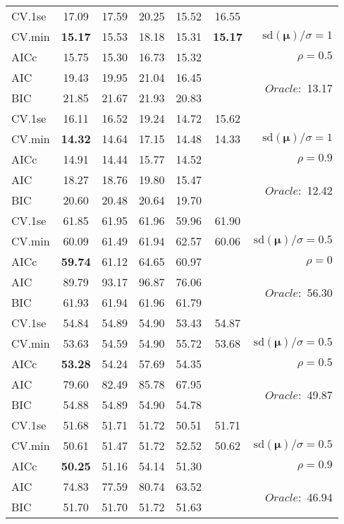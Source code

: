 \begin{table}
\begin{center}
\begin{tabular}{l*{5}{c}|r}
 \hline 
CV.1se & 17.09 & 17.59 & 20.25 & 15.52 & 16.55 & \\
CV.min & {\bf 15.17} & 15.53 & 18.18 & 15.31 & {\bf 15.17} &  $\mathrm{sd}(\mathbf{\mu})/\sigma=1$ \\
AICc & 15.75 & 15.30 & 16.73 & 15.32 & & $\rho=0.5$ \\
AIC & 19.43 & 19.95 & 21.04 & 16.45 & &  \multirow{2}{*}{$Oracle: $ 13.17} \\
BIC & 21.85 & 21.67 & 21.93 & 20.83 & &  \\
 \hline 
CV.1se & 16.11 & 16.52 & 19.24 & 14.72 & 15.62 & \\
CV.min & {\bf 14.32} & 14.64 & 17.15 & 14.48 & 14.33 &  $\mathrm{sd}(\mathbf{\mu})/\sigma=1$ \\
AICc & 14.91 & 14.44 & 15.77 & 14.52 & & $\rho=0.9$ \\
AIC & 18.27 & 18.76 & 19.80 & 15.47 & &  \multirow{2}{*}{$Oracle: $ 12.42} \\
BIC & 20.60 & 20.48 & 20.64 & 19.70 & &  \\
 \hline 
CV.1se & 61.85 & 61.95 & 61.96 & 59.96 & 61.90 & \\
CV.min & 60.09 & 61.49 & 61.94 & 62.57 & 60.06 &  $\mathrm{sd}(\mathbf{\mu})/\sigma=0.5$ \\
AICc & {\bf 59.74} & 61.12 & 64.65 & 60.97 & & $\rho=0$ \\
AIC & 89.79 & 93.17 & 96.87 & 76.06 & &  \multirow{2}{*}{$Oracle: $ 56.30} \\
BIC & 61.93 & 61.94 & 61.96 & 61.79 & &  \\
 \hline 
CV.1se & 54.84 & 54.89 & 54.90 & 53.43 & 54.87 & \\
CV.min & 53.63 & 54.59 & 54.90 & 55.72 & 53.68 &  $\mathrm{sd}(\mathbf{\mu})/\sigma=0.5$ \\
AICc & {\bf 53.28} & 54.24 & 57.69 & 54.35 & & $\rho=0.5$ \\
AIC & 79.60 & 82.49 & 85.78 & 67.95 & &  \multirow{2}{*}{$Oracle: $ 49.87} \\
BIC & 54.88 & 54.89 & 54.90 & 54.78 & &  \\
 \hline 
CV.1se & 51.68 & 51.71 & 51.72 & 50.51 & 51.71 & \\
CV.min & 50.61 & 51.47 & 51.72 & 52.52 & 50.62 &  $\mathrm{sd}(\mathbf{\mu})/\sigma=0.5$ \\
AICc & {\bf 50.25} & 51.16 & 54.14 & 51.30 & & $\rho=0.9$ \\
AIC & 74.83 & 77.59 & 80.74 & 63.52 & &  \multirow{2}{*}{$Oracle: $ 46.94} \\
BIC & 51.70 & 51.70 & 51.72 & 51.63 & &  \\
 \hline 
\end{tabular}
\end{center}
\vspace{-1cm}
\end{table}





